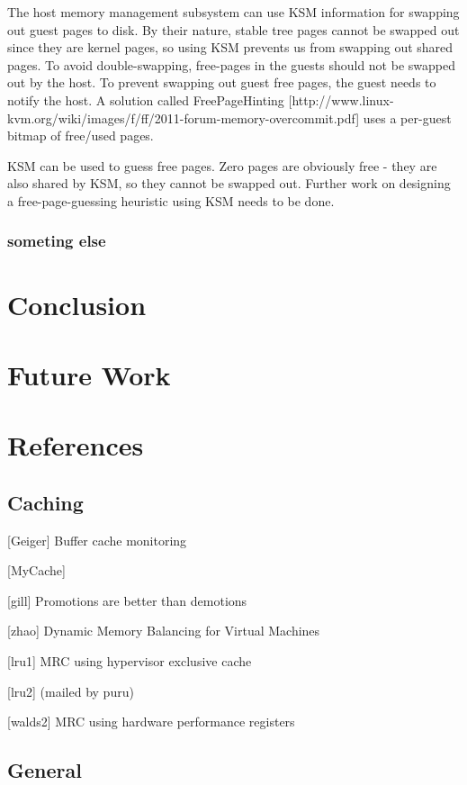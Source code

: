 \documentclass[10pt,a4paper]{article}
\begin{document}
The host memory management subsystem can use KSM information for swapping out guest pages to disk. By their nature, stable tree pages cannot be swapped out since they are kernel pages, so using KSM prevents us from swapping out shared pages. 
To avoid double-swapping, free-pages in the guests should not be swapped out by the host. To prevent swapping out guest free pages, the guest needs to notify the host. 
A solution called FreePageHinting [http://www.linux-kvm.org/wiki/images/f/ff/2011-forum-memory-overcommit.pdf] uses a per-guest bitmap of free/used pages. 

KSM can be used to guess free pages. Zero pages are obviously free - they are also shared by KSM, so they cannot be swapped out. Further work on designing a free-page-guessing heuristic using KSM needs to be done.

\subsubsection{someting else}

\section{Conclusion}

\section{Future Work}
  
\section{References}

\subsection{Caching}

[Geiger] Buffer cache monitoring 

[MyCache]

[gill] Promotions are better than demotions

[zhao] Dynamic Memory Balancing for Virtual Machines

[lru1] MRC using hypervisor exclusive cache

[lru2] (mailed by puru)

[walds2] MRC using hardware performance registers 

\subsection{General}
\end{document}

